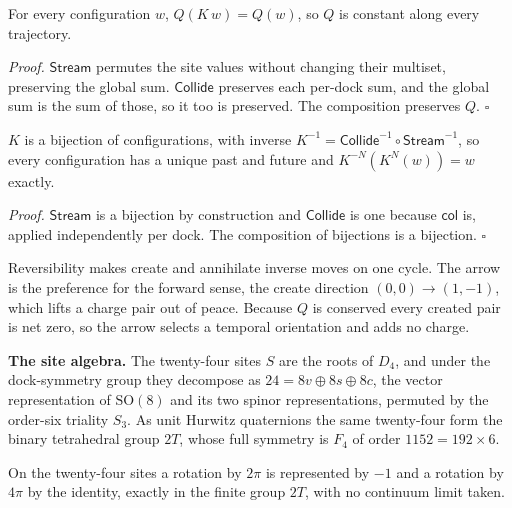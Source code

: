 \begin{proposition}
For every configuration $w$, $Q(K\,w) = Q(w)$, so $Q$ is constant along every trajectory. \cite{pollard2026vibetest}
\end{proposition}

\textit{Proof.} $\mathsf{Stream}$ permutes the site values without changing their multiset, preserving the global sum. $\mathsf{Collide}$ preserves each per-dock sum, and the global sum is the sum of those, so it too is preserved. The composition preserves $Q$. \hfill$\square$

\begin{proposition}[Reversibility]
$K$ is a bijection of configurations, with inverse $K^{-1} = \mathsf{Collide}^{-1} \circ \mathsf{Stream}^{-1}$, so every configuration has a unique past and future and $K^{-N}(K^{N}(w)) = w$ exactly. \cite{pollard2026vibetest}
\end{proposition}

\textit{Proof.} $\mathsf{Stream}$ is a bijection by construction and $\mathsf{Collide}$ is one because $\mathsf{col}$ is, applied independently per dock. The composition of bijections is a bijection. \hfill$\square$

\begin{result}
Reversibility makes create and annihilate inverse moves on one cycle. The arrow is the preference for the forward sense, the create direction $(0,0) \to (1,-1)$, which lifts a charge pair out of peace. Because $Q$ is conserved every created pair is net zero, so the arrow selects a temporal orientation and adds no charge. \cite{pollard2026vibetest}
\end{result}

\textbf{The site algebra.} The twenty-four sites $S$ are the roots of $D_4$, and under the dock-symmetry group they decompose as $24 = 8v \oplus 8s \oplus 8c$, the vector representation of $\mathrm{SO}(8)$ and its two spinor representations, permuted by the order-six triality $S_3$. As unit Hurwitz quaternions the same twenty-four form the binary tetrahedral group $2T$, whose full symmetry is $F_4$ of order $1152 = 192 \times 6$.

\begin{theorem}
On the twenty-four sites a rotation by $2\pi$ is represented by $-1$ and a rotation by $4\pi$ by the identity, exactly in the finite group $2T$, with no continuum limit taken.
\end{theorem}

